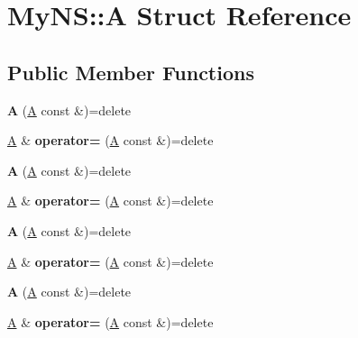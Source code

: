 \hypertarget{struct_my_n_s_1_1_a}{}\section{My\+NS\+:\+:A Struct Reference}
\label{struct_my_n_s_1_1_a}
\subsection*{Public Member Functions}
\begin{DoxyCompactItemize}
\item 
\mbox{\label{struct_my_n_s_1_1_a_a0a15c11fcaab182f87be51a9f449f1c5}} 
{\bfseries A} (\mbox{\hyperlink{struct_my_n_s_1_1_a}{A}} const \&)=delete
\item 
\mbox{\label{struct_my_n_s_1_1_a_aecc24845e554cd394a9d5c9b02f9dff1}} 
\mbox{\hyperlink{struct_my_n_s_1_1_a}{A}} \& {\bfseries operator=} (\mbox{\hyperlink{struct_my_n_s_1_1_a}{A}} const \&)=delete
\item 
\mbox{\label{struct_my_n_s_1_1_a_a0a15c11fcaab182f87be51a9f449f1c5}} 
{\bfseries A} (\mbox{\hyperlink{struct_my_n_s_1_1_a}{A}} const \&)=delete
\item 
\mbox{\label{struct_my_n_s_1_1_a_aecc24845e554cd394a9d5c9b02f9dff1}} 
\mbox{\hyperlink{struct_my_n_s_1_1_a}{A}} \& {\bfseries operator=} (\mbox{\hyperlink{struct_my_n_s_1_1_a}{A}} const \&)=delete
\item 
\mbox{\label{struct_my_n_s_1_1_a_a0a15c11fcaab182f87be51a9f449f1c5}} 
{\bfseries A} (\mbox{\hyperlink{struct_my_n_s_1_1_a}{A}} const \&)=delete
\item 
\mbox{\label{struct_my_n_s_1_1_a_aecc24845e554cd394a9d5c9b02f9dff1}} 
\mbox{\hyperlink{struct_my_n_s_1_1_a}{A}} \& {\bfseries operator=} (\mbox{\hyperlink{struct_my_n_s_1_1_a}{A}} const \&)=delete
\item 
\mbox{\label{struct_my_n_s_1_1_a_a0a15c11fcaab182f87be51a9f449f1c5}} 
{\bfseries A} (\mbox{\hyperlink{struct_my_n_s_1_1_a}{A}} const \&)=delete
\item 
\mbox{\label{struct_my_n_s_1_1_a_aecc24845e554cd394a9d5c9b02f9dff1}} 
\mbox{\hyperlink{struct_my_n_s_1_1_a}{A}} \& {\bfseries operator=} (\mbox{\hyperlink{struct_my_n_s_1_1_a}{A}} const \&)=delete
\end{DoxyCompactItemize}


